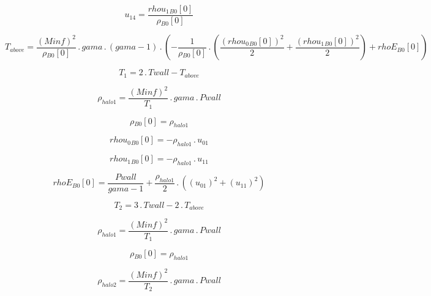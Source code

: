 \documentclass{article}
\begin{document}
\begin{dmath}u_{14} = \frac{{rhou_{1}{_{B0}}}[{0}]}{{\rho{_{B0}}}[{0}]}\end{dmath}

\begin{dmath}T_{above} = \frac{\left(Minf \right)^{2}}{{\rho{_{B0}}}[{0}]} \,.\, gama \,.\, \left(gama - 1\right) \,.\, \left(- \frac{1}{{\rho{_{B0}}}[{0}]} \,.\, \left(\frac{\left({rhou_{0}{_{B0}}}[{0}] \right)^{2}}{2} + 
\frac{\left({rhou_{1}{_{B0}}}[{0}] \right)^{2}}{2}\right) + {rhoE{_{B0}}}[{0}]\right)\end{dmath}

\begin{dmath}T_{1} = 2 \,.\, Twall - T_{above}\end{dmath}

\begin{dmath}\rho_{halo 1} = \frac{\left(Minf \right)^{2}}{T_{1}} \,.\, gama \,.\, Pwall\end{dmath}

\begin{dmath}{\rho{_{B0}}}[{0}] = \rho_{halo 1}\end{dmath}

\begin{dmath}{rhou_{0}{_{B0}}}[{0}] = - \rho_{halo 1} \,.\, u_{01}\end{dmath}

\begin{dmath}{rhou_{1}{_{B0}}}[{0}] = - \rho_{halo 1} \,.\, u_{11}\end{dmath}

\begin{dmath}{rhoE{_{B0}}}[{0}] = \frac{Pwall}{gama - 1} + \frac{\rho_{halo 1}}{2} \,.\, \left(\left(u_{01} \right)^{2} + \left(u_{11} \right)^{2}\right)\end{dmath}

\begin{dmath}T_{2} = 3 \,.\, Twall - 2 \,.\, T_{above}\end{dmath}

\begin{dmath}\rho_{halo 1} = \frac{\left(Minf \right)^{2}}{T_{1}} \,.\, gama \,.\, Pwall\end{dmath}

\begin{dmath}{\rho{_{B0}}}[{0}] = \rho_{halo 1}\end{dmath}

\begin{dmath}\rho_{halo 2} = \frac{\left(Minf \right)^{2}}{T_{2}} \,.\, gama \,.\, Pwall\end{dmath}
\end{document}
